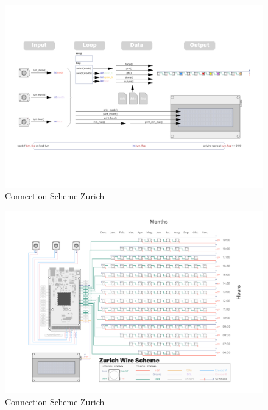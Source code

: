 \documentclass[a4paper,9pt]{article}
\begin{document}
\begin{landscape}
\begin{figure}[H]
        \centering
        \includegraphics[width=.9\linewidth, trim={50 50 50 50}]{Images/plan software.pdf}
        \caption{Connection Scheme Zurich}
        \label{flowcode}
    \end{figure}

 \begin{figure}[H]
        \centering
        \includegraphics[width=\linewidth, trim={50 50 50 50}]{Images/schaltplan ZH.pdf}
        \caption{Connection Scheme Zurich}
        \label{scheme ZH}
    \end{figure}


\end{landscape}
\end{document}

